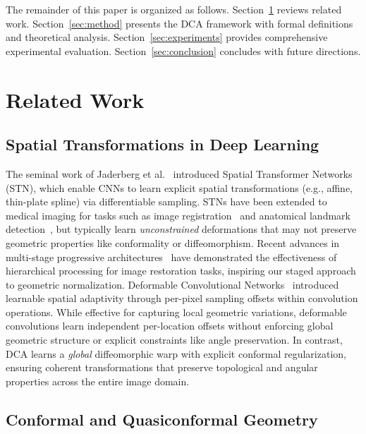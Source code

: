 \documentclass[final,3p,times,review,sort&compress]{elsarticle}
\begin{document}
The remainder of this paper is organized as follows. Section~\ref{sec:related} reviews related work. Section~\ref{sec:method} presents the DCA framework with formal definitions and theoretical analysis. Section~\ref{sec:experiments} provides comprehensive experimental evaluation. Section~\ref{sec:conclusion} concludes with future directions.

\section{Related Work}
\label{sec:related}

\subsection{Spatial Transformations in Deep Learning}

The seminal work of Jaderberg et al.~\cite{jaderberg2015spatial} introduced Spatial Transformer Networks (STN), which enable CNNs to learn explicit spatial transformations (e.g., affine, thin-plate spline) via differentiable sampling. STNs have been extended to medical imaging for tasks such as image registration~\cite{balakrishnan2019voxelmorph} and anatomical landmark detection~\cite{payer2019integrating}, but typically learn \textit{unconstrained} deformations that may not preserve geometric properties like conformality or diffeomorphism. Recent advances in multi-stage progressive architectures~\cite{liu2025mstnet,he2025multi} have demonstrated the effectiveness of hierarchical processing for image restoration tasks, inspiring our staged approach to geometric normalization. Deformable Convolutional Networks~\cite{dai2017deformable,zhu2019deformable} introduced learnable spatial adaptivity through per-pixel sampling offsets within convolution operations. While effective for capturing local geometric variations, deformable convolutions learn independent per-location offsets without enforcing global geometric structure or explicit constraints like angle preservation. In contrast, DCA learns a \textit{global} diffeomorphic warp with explicit conformal regularization, ensuring coherent transformations that preserve topological and angular properties across the entire image domain.

\subsection{Conformal and Quasiconformal Geometry}
\end{document}
